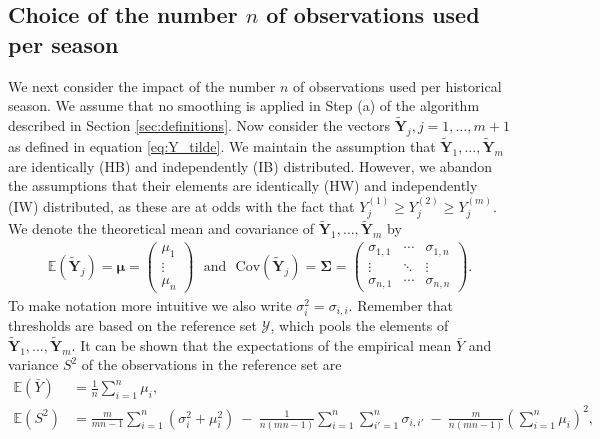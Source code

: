 \documentclass[12pt]{article}
\begin{document}
\subsection{Choice of the number $n$ of observations used per season}
\label{subsec:choice_n}


We next consider the impact of the number $n$ of observations used per historical season. We assume that no smoothing is applied in Step (a) of the algorithm described in Section \ref{sec:definitions}. Now consider the vectors $\tilde{\mathbf{Y}}_j, j = 1, \dots, m + 1$ as defined in equation \eqref{eq:Y_tilde}. %
We maintain the assumption that $\tilde{\mathbf{Y}}_1, \dots, \tilde{\mathbf{Y}}_m$ are identically (HB) and independently (IB) distributed. However, we abandon the assumptions that their elements are identically (HW) and independently (IW) distributed, as these are at odds with the fact that $Y_j^{(1)} \geq Y_j^{(2)} \geq Y_j^{(m)}$. We denote the theoretical mean and covariance of $\tilde{\mathbf{Y}}_1, \dots, \tilde{\mathbf{Y}}_m$ by
\begin{align}
\mathbb{E}\left(\tilde{\mathbf{Y}}_j\right) = \boldsymbol{\mu} = \left(\begin{array}{c}
\mu_1\\
\vdots\\
\mu_n
\end{array}\right) \ \ \ \text{and} \ \ \ \text{Cov}\left(\tilde{\mathbf{Y}}_j\right) = \boldsymbol{\Sigma} =
\left(\begin{array}{ccc}
\sigma_{1, 1} & \cdots & \sigma_{1, n}\\
\vdots & \ddots &\vdots\\
\sigma_{n, 1} & \cdots & \sigma_{n, n}
\end{array}\right).
\end{align}
To make notation more intuitive we also write $\sigma^2_i = \sigma_{i, i}$. Remember that thresholds are based on the reference set $\mathcal{Y}$, which pools the elements of $\tilde{\mathbf{Y}}_1, \dots, \tilde{\mathbf{Y}}_m$. It can be shown that the expectations of the empirical mean $\bar{Y}$ and variance $S^2$ of the observations in the reference set are
\begin{align}
\mathbb{E}(\bar{Y}) & = \frac{1}{n} \sum_{i = 1}^n \mu_i,
\label{eq:expectation_mu}\\
\mathbb{E}(S^2) & = \frac{m}{mn - 1} \sum_{i = 1}^n (\sigma_{i}^2 + \mu_i^2) \ - \ \frac{1}{n(mn - 1)} \sum_{i = 1}^n \sum_{i' = 1}^n \sigma_{i,i'} \ - \ \frac{m}{n(mn - 1)}\left(\sum_{i = 1}^n \mu_i\right)^2,
\label{eq:expectation_sigma2}
\end{align}
\end{document}
